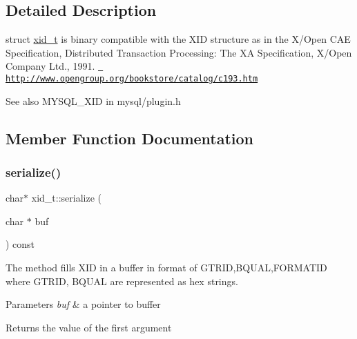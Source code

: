 \subsection{Detailed Description}
struct \mbox{\hyperlink{structxid__t}{xid\+\_\+t}} is binary compatible with the X\+ID structure as in the X/\+Open C\+AE Specification, Distributed Transaction Processing\+: The XA Specification, X/\+Open Company Ltd., 1991. \href{http://www.opengroup.org/bookstore/catalog/c193.htm}\texttt{ http\+://www.\+opengroup.\+org/bookstore/catalog/c193.\+htm}

\begin{DoxySeeAlso}{See also}
M\+Y\+S\+Q\+L\+\_\+\+X\+ID in mysql/plugin.\+h 
\end{DoxySeeAlso}


\subsection{Member Function Documentation}
\mbox{\label{structxid__t_a710d3e4dfa255380fcbc9165f4e89e3a}} 
\subsubsection{\texorpdfstring{serialize()}{serialize()}}
{\footnotesize\ttfamily char$\ast$ xid\+\_\+t\+::serialize (\begin{DoxyParamCaption}\item[{char $\ast$}]{buf }\end{DoxyParamCaption}) const\hspace{0.3cm}{\ttfamily [inline]}}

The method fills X\+ID in a buffer in format of G\+T\+R\+ID,B\+Q\+U\+AL,F\+O\+R\+M\+A\+T\+ID where G\+T\+R\+ID, B\+Q\+U\+AL are represented as hex strings.


\begin{DoxyParams}{Parameters}
{\em buf} & a pointer to buffer \\
\hline
\end{DoxyParams}
\begin{DoxyReturn}{Returns}
the value of the first argument 
\end{DoxyReturn}
\mbox{\label{structxid__t_afc1a393878eb80489d39a8cb77d95239}} 

